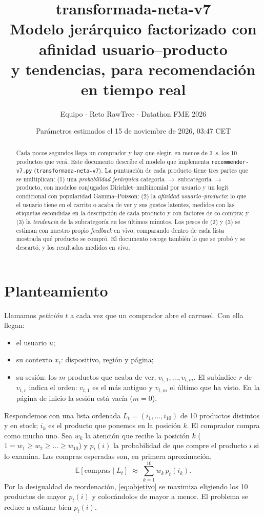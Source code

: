 \documentclass[11pt,a4paper]{article}
\title{\textbf{transformada-neta-v7}\\[0.3em]
\large Modelo jerárquico factorizado con afinidad usuario--producto\\ y tendencias, para recomendación en tiempo real}
\author{Equipo \cod{team\_03} $\cdot$ Reto RawTree $\cdot$ Datathon FME 2026}
\date{Parámetros estimados el 15 de noviembre de 2026, 03:47 CET}
\newcommand{\E}{\mathbb{E}}
\newcommand{\cod}[1]{\texttt{#1}}
\begin{document}
\maketitle

\begin{abstract}
\noindent Cada pocos segundos llega un comprador y hay que elegir, en menos de 3~s, los 10 productos
que verá. Este documento describe el modelo que implementa \cod{recommender-v7.py}
(\cod{transformada-neta-v7}). La puntuación de cada producto tiene tres partes que se multiplican:
(1) una \emph{probabilidad jerárquica} categoría $\to$ subcategoría $\to$ producto, con modelos conjugados
Dirichlet--multinomial por usuario y un logit condicional con popularidad Gamma--Poisson; (2) la
\emph{afinidad usuario--producto}: lo que el usuario tiene en el carrito o acaba de ver y sus gustos
latentes, medidos con las etiquetas escondidas en la descripción de cada producto y con factores de
co-compra; y (3) la \emph{tendencia} de la subcategoría en los últimos minutos. Los pesos de (2) y (3) se
estiman con nuestro propio \emph{feedback} en vivo, comparando dentro de cada lista mostrada qué producto
se compró. El documento recoge también lo que se probó y se
descartó, y los resultados medidos en vivo.
\end{abstract}

\section{Planteamiento}

Llamamos \emph{petición} $t$ a cada vez que un comprador abre el carrusel. Con ella llegan:
\begin{itemize}\setlength{\itemsep}{0.1em}
\item el usuario $u$;
\item su contexto $x_t$: dispositivo, región y página;
\item su sesión: los $m$ productos que acaba de ver, $v_{t,1},\dots,v_{t,m}$. El subíndice $r$ de
$v_{t,r}$ indica el orden: $v_{t,1}$ es el más antiguo y $v_{t,m}$ el último que ha visto. En la página
de inicio la sesión está vacía ($m=0$).
\end{itemize}
Respondemos con una lista ordenada $L_t=(i_1,\dots,i_{10})$ de 10 productos distintos y en stock; $i_k$
es el producto que ponemos en la posición $k$. El comprador compra como mucho uno. Sea $w_k$ la atención
que recibe la posición $k$ ($1=w_1\ge w_2\ge\dots\ge w_{10}$) y $p_t(i)$ la probabilidad de que compre
el producto $i$ si lo examina. Las compras esperadas son, en primera aproximación,
\begin{equation}
\E[\text{compras}\mid L_t] \;\approx\; \sum_{k=1}^{10} w_k\, p_t(i_k). \label{eq:objetivo}
\end{equation}
Por la desigualdad de reordenación, \eqref{eq:objetivo} se maximiza eligiendo los 10 productos de
mayor $p_t(i)$ y colocándolos de mayor a menor. El problema se reduce a estimar bien $p_t(i)$.
\end{document}
